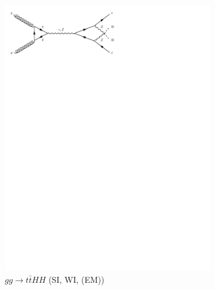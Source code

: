\begin{figure}[h]
\begin{subfigure}[b]{0.3\textwidth}
    \includegraphics[trim={0.5cm 22cm 10cm 0cm},width=\textwidth]{../Diagrams/D14.pdf}
    \caption{$gg\rightarrow t\bar{t}HH$ (SI, WI, (EM))}
    \label{fey:14}
  \end{subfigure}%
  ~
  \begin{subfigure}[b]{0.3\textwidth}

\end{subfigure}
\end{figure}
